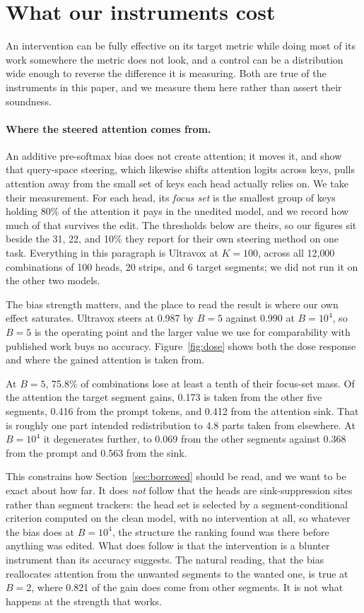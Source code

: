 \documentclass[11pt]{article}
\begin{document}
\section{What our instruments cost}
\label{sec:cost}

An intervention can be fully effective on its target metric while doing most of
its work somewhere the metric does not look, and a control can be a distribution
wide enough to reverse the difference it is measuring. Both are true of the
instruments in this paper, and we measure them here rather than assert their
soundness.

\paragraph{Where the steered attention comes from.}
An additive pre-softmax bias does not create attention; it moves it, and
\citet{skop2026} show that query-space steering, which likewise shifts attention
logits across keys, pulls attention away from the small set of keys each head
actually relies on. We take their measurement. For
each head, its \emph{focus set} is the smallest group of keys holding 80\% of the
attention it pays in the unedited model, and we record how much of that survives
the edit. The thresholds below are theirs, so our figures sit beside the 31, 22,
and 10\% they report for their own steering method on one task. Everything in this paragraph is Ultravox at $K{=}100$,
across all 12{,}000 combinations of 100 heads, 20 strips, and 6 target segments;
we did not run it on the other two models.

The bias strength matters, and the place to read the result is where our own
effect saturates. Ultravox steers at 0.987 by $B{=}5$ against 0.990 at
$B{=}10^4$, so $B{=}5$ is the operating point and the larger value we use for
comparability with published work buys no accuracy. Figure~\ref{fig:dose} shows
both the dose response and where the gained attention is taken from.

At $B{=}5$, 75.8\% of combinations lose at least a tenth of their focus-set mass.
Of the attention the target segment gains, 0.173 is taken from the other five
segments, 0.416 from the prompt tokens, and 0.412 from the attention sink. That is roughly one part
intended redistribution to 4.8 parts taken from elsewhere. At $B{=}10^4$ it
degenerates further, to 0.069 from the other segments against 0.368 from the
prompt and 0.563 from the sink.

This constrains how Section~\ref{sec:borrowed} should be read, and we want to be
exact about how far. It does \emph{not} follow that the heads are sink-suppression
sites rather than segment trackers: the head set is selected by a
segment-conditional criterion computed on the clean model, with no intervention
at all, so whatever the bias does at $B{=}10^4$, the structure the ranking found
was there before anything was edited. What does follow is that the intervention
is a blunter instrument than its accuracy suggests. The natural reading, that the
bias reallocates attention from the unwanted segments to the wanted one, is true
at $B{=}2$, where 0.821 of the gain does come from other segments. It is not what
happens at the strength that works.
\end{document}
